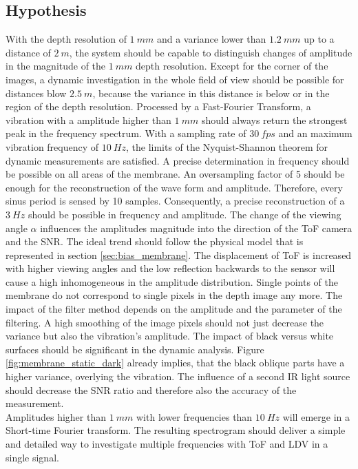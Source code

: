\subsection{Hypothesis}  
With the depth resolution of $1~mm$ and a variance lower than $1.2~mm$ up to a distance of $2~m$, the system should be capable to distinguish changes of amplitude in the magnitude of the $1~mm$ depth resolution. Except for the corner of the images, a dynamic investigation in the whole field of view should be possible for distances blow $2.5~m$, because the variance in this distance is below or in the region of the depth resolution. Processed by a Fast-Fourier Transform, a vibration with a amplitude higher than $1~mm$ should always return the strongest peak in the frequency spectrum. With a sampling rate of $30~fps$ and an maximum vibration frequency of $10~Hz$, the limits of the Nyquist-Shannon theorem for dynamic measurements are satisfied. A precise determination in frequency should be possible on all areas of the membrane. An oversampling factor of 5 should be enough for the reconstruction of the wave form and amplitude. Therefore, every sinus period is sensed by 10 samples. Consequently, a precise reconstruction of a $3~Hz$ should be possible in frequency and amplitude. The change of the viewing angle $\alpha$ influences the amplitudes magnitude into the direction of the ToF camera and the SNR. The ideal trend should follow the physical model that is represented in section \ref{sec:bias_membrane}. The displacement of ToF is increased with higher viewing angles and the low reflection backwards to the sensor will cause a high inhomogeneous in the amplitude distribution. Single points of the membrane do not correspond to single pixels in the depth image any more. The impact of the filter method depends on the amplitude and the parameter of the filtering. A high smoothing of the image pixels should not just decrease the variance but also the vibration's amplitude. The impact of black versus white surfaces should be significant in the dynamic analysis. Figure \ref{fig:membrane_static_dark} already implies, that the black oblique parts have a higher variance, overlying the vibration. The influence of a second IR light source should decrease the SNR ratio and therefore also the accuracy of the measurement.\\ 

Amplitudes higher than $1~mm$ with lower frequencies than $10~Hz$ will emerge in a Short-time Fourier transform. The resulting spectrogram should deliver a simple and detailed way to investigate multiple frequencies with ToF and LDV in a single signal.\\

